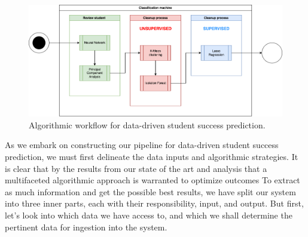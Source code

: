 \documentclass[../main.tex]{subfiles}
\begin{document}
\begin{figure}[h!]      
    \includegraphics[width=1\linewidth]{res//diagram/ML Workflow.png}
    \caption{Algorithmic workflow for data-driven student success prediction.}
    \label{fig:dataworkflow}
\end{figure}
As we embark on constructing our pipeline for data-driven student success prediction, we must first delineate the data inputs and algorithmic strategies. 
It is clear that by the results from our state of the art and analysis that a multifaceted algorithmic approach is warranted to optimize outcomes
To extract as much information and get the possible best results, we have split our system into three inner parts, each with their responsibility, input, and output.
But first, let's look into which data we have access to, and which we shall determine the pertinent data for ingestion into the system.
\end{document}
